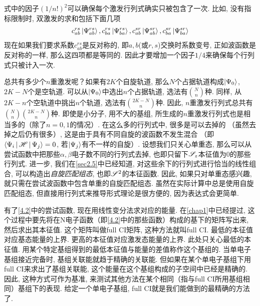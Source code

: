 式中的因子$(1/n!)^2$可以确保每个激发行列式确实只被包含了一次. 
比如, 
没有指标限制时, 
双激发的求和包括下面几项
\begin{align*}
c_{ab}^{rs}\Ket{\Psi_{ab}^{rs}}, 
c_{ba}^{rs}\Ket{\Psi_{ba}^{rs}}, 
c_{ab}^{sr}\Ket{\Psi_{ab}^{sr}},
c_{ba}^{sr}\Ket{\Psi_{ba}^{sr}}
\end{align*}
现在如果我们要求系数$c_{ab}^{rs}$是反对称的, 
即$a,b$(或$r,s$)交换时系数变号, 
正如波函数是反对称的一样, 
那么这四项都是等同的. 
因此才要增加一个因子$1/4$来确保每个行列式只被计入一次.


总共有多少个$n$重激发呢？如果有$2K$个自旋轨道, 
那么$N$个占据轨道构成$\Ket{\Psi_0}$, 
$2K-N$个是空轨道. 
可以从$\Ket{\Psi_0}$中选出$n$个占据轨道, 
选法有$\binom{N}{n}$种. 
同样, 
从$2K-n$个空轨道中挑出$n$个轨道, 
选法有$\binom{2K-N}{n}$种. 
因此, 
$n$重激发行列式总共有$\binom{N}{n}\binom{2K-N}{n}$种. 
即使是小分子, 
用不大的基组, 
所生成的$n$重激发行列式也是相当多的（除了$n=0,1$的情况）. 
在这么多的行列式中, 
很多是可以去掉的 （虽然去掉之后仍有很多）,
这是由于具有不同自旋的波函数不发生混合 （即$\Braket{\Psi_i|\mathscr{H}|\Psi_j}=0$, 
若$\Ket{\Psi_j}$有不一样的自旋）. 
设想我们只关心单重态, 
那么可以从尝试函数中把那些$\alpha,\beta$电子数不同的行列式去掉, 
也即只留下$\mathscr{S}_z$本征值为0的那些行列式. 
进一步, 
我们在\ref{sec2.5}中已经知道, 
对这些余下的行列式进行恰当的线性组合, 
可以构造出\emph{自旋匹配组态}, 
也即$\mathscr{S}^2$的本征函数. 
因此, 
如果只对单重态感兴趣, 
就只需在尝试波函数中包含单重的自旋匹配组态. 
虽然在实际计算中总是使用自旋匹配组态, 
但直接用行列式来推导形式理论是很方便的, 
因为表达式会更简单.


有了\eqref{4.2}中的尝试函数, 
现在用线性变分法求对应的能量. 
在\ref{chap1}中已经提过, 
这个过程中要先将\ha 在N电子函数（即\eqref{4.2}中的那些函数）构成的基下的矩阵写出来, 
然后求出其本征值. 
这个矩阵叫做full CI矩阵, 
这种方法就叫full CI. 
最低的本征值对应基态能量的上界. 
更高的本征值对应激发态能量的上界. 
此处只关心最低的本征值. 
用某个特定基组得到的最低本征值与\hft 能量的差值称作这个基组的. 
当单电子基组接近完备时, 
基组关联能就趋于精确的关联能. 
但如果在某个单电子基组下用full CI来求出了基组关联能, 
这个能量在这个基组构成的子空间中已经是精确的. 
因此, 
这种方式可作为基准, 
来测试其他方法在某个相同（指与full CI所用基组相同）基组下的表现. 
给定一个单电子基组, 
full CI就是我们能做到的最精确的方法了.


